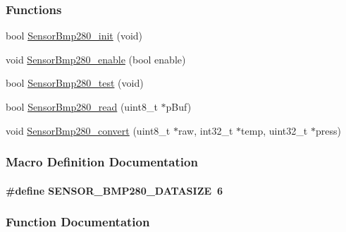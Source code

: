 \subsubsection*{Functions}
\begin{DoxyCompactItemize}
\item 
bool \hyperlink{_sensor_bmp280_8h_a67801dc56a9a7f4e9f3761d9109f4aea}{Sensor\+Bmp280\+\_\+init} (void)
\item 
void \hyperlink{_sensor_bmp280_8h_aaf6ce6b44986cf16c8cff37ca93819d3}{Sensor\+Bmp280\+\_\+enable} (bool enable)
\item 
bool \hyperlink{_sensor_bmp280_8h_a5060983453e618dce650d2aaf02c549a}{Sensor\+Bmp280\+\_\+test} (void)
\item 
bool \hyperlink{_sensor_bmp280_8h_aa8159e0f74495b5e424cc57d4e974c10}{Sensor\+Bmp280\+\_\+read} (uint8\+\_\+t $\ast$p\+Buf)
\item 
void \hyperlink{_sensor_bmp280_8h_a11f9ccbd3832161046b7e43d4c9544ba}{Sensor\+Bmp280\+\_\+convert} (uint8\+\_\+t $\ast$raw, int32\+\_\+t $\ast$temp, uint32\+\_\+t $\ast$press)
\end{DoxyCompactItemize}


\subsubsection{Macro Definition Documentation}
\paragraph[{S\+E\+N\+S\+O\+R\+\_\+\+B\+M\+P280\+\_\+\+D\+A\+T\+A\+S\+I\+Z\+E}]{\setlength{\rightskip}{0pt plus 5cm}\#define S\+E\+N\+S\+O\+R\+\_\+\+B\+M\+P280\+\_\+\+D\+A\+T\+A\+S\+I\+Z\+E~6}\label{_sensor_bmp280_8h_ad917f5bcd2a29d9179fdbb014e7bdfa1}


\subsubsection{Function Documentation}

